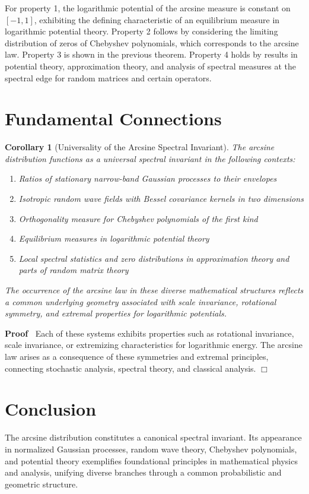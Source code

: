 \documentclass{article}
\newenvironment{proof}{\noindent\textbf{Proof\ }}{\hspace*{\fill}$\Box$\medskip}
\newtheorem{corollary}{Corollary}
\begin{document}
For property 1, the logarithmic potential of the arcsine measure is constant
on $[- 1, 1]$, exhibiting the defining characteristic of an equilibrium
measure in logarithmic potential theory. Property 2 follows by considering the
limiting distribution of zeros of Chebyshev polynomials, which corresponds to
the arcsine law. Property 3 is shown in the previous theorem. Property 4 holds
by results in potential theory, approximation theory, and analysis of spectral
measures at the spectral edge for random matrices and certain operators.

\section{Fundamental Connections}

\begin{corollary}
  [Universality of the Arcsine Spectral Invariant] The arcsine distribution
  functions as a universal spectral invariant in the following contexts:
  \begin{enumerate}
    \item Ratios of stationary narrow-band Gaussian processes to their
    envelopes
    
    \item Isotropic random wave fields with Bessel covariance kernels in two
    dimensions
    
    \item Orthogonality measure for Chebyshev polynomials of the first kind
    
    \item Equilibrium measures in logarithmic potential theory
    
    \item Local spectral statistics and zero distributions in approximation
    theory and parts of random matrix theory
  \end{enumerate}
  The occurrence of the arcsine law in these diverse mathematical structures
  reflects a common underlying geometry associated with scale invariance,
  rotational symmetry, and extremal properties for logarithmic potentials.
\end{corollary}

\begin{proof}
  Each of these systems exhibits properties such as rotational invariance,
  scale invariance, or extremizing characteristics for logarithmic energy. The
  arcsine law arises as a consequence of these symmetries and extremal
  principles, connecting stochastic analysis, spectral theory, and classical
  analysis.
\end{proof}

\section{Conclusion}

The arcsine distribution constitutes a canonical spectral invariant. Its
appearance in normalized Gaussian processes, random wave theory, Chebyshev
polynomials, and potential theory exemplifies foundational principles in
mathematical physics and analysis, unifying diverse branches through a common
probabilistic and geometric structure.
\end{document}

